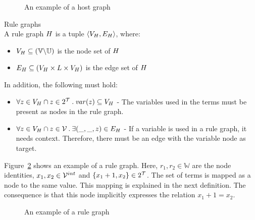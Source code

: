\begin{figure}[ht]
  \begin{center}
    
  \end{center}
  \caption{An example of a host graph}
  \label{fig:hostgraph_example}
\end{figure}

\vspace{10px}
\begin{definition} Rule graphs \\
A rule graph $H$ is a tuple $\langle V_{H}, E_{H} \rangle$, where:
\begin{itemize}
  \item $V_{H} \subseteq (\mathbb{V} \backslash \mathbb{U})$ is the node set of $H$
  \item $E_{H} \subseteq (V_{H} \times L \times V_{H})$ is the edge set of $H$
\end{itemize}
In addition, the following must hold:
\begin{itemize}
\item $\forall z \in V_{H} \cap z \in 2^{\mathcal{T}}\: .\:\mathit{var}(z) \subseteq V_{H}$ - The variables used in the terms must be present as nodes in the rule graph.
\item $\forall z \in V_{H} \cap z \in \mathcal{V}\: .\: \exists (\_, \_, z) \in E_{H}$ - If a variable is used in a rule graph, it needs context. Therefore, there must be an edge with the variable node as target.
\end{itemize}
\end{definition}
\vspace{10px}

Figure~\ref{fig:rulegraph_example} shows an example of a rule graph. Here, $r_1, r_2 \in \mathbb{W}$ are the node identities, $x_1,x_2 \in \mathcal{V}^{int}$ and $\{x_1+1, x_2\} \in 2^{\mathcal{T}}$. The set of terms is mapped as a node to the same value. This mapping is explained in the next definition. The consequence is that this node implicitly expresses the relation $x_1+1 = x_2$.

\begin{figure}[ht]
  \begin{center}
    
  \end{center}
  \caption{An example of a rule graph}
  \label{fig:rulegraph_example}
\end{figure}

